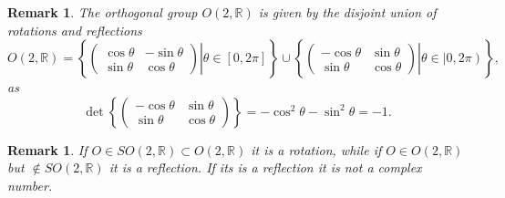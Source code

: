 \documentclass[aps,preprint]{revtex4}
\newtheorem{remark}[theorem]{Remark}
\begin{document}
\begin{remark}
The orthogonal group $O\left( 2,\mathbb{R}\right) $ is given by the disjoint
union of rotations and reflections 
\begin{equation}
O\left( 2,\mathbb{R}\right) =\left\{ \left. \left( 
\begin{array}{cc}
\cos \theta & -\sin \theta \\ 
\sin \theta & \cos \theta%
\end{array}%
\right) \right\vert \theta \in \left[ 0,2\pi \right] \right\} \cup \left\{
\left. \left( 
\begin{array}{cc}
-\cos \theta & \sin \theta \\ 
\sin \theta & \cos \theta%
\end{array}%
\right) \right\vert \theta \in \left\vert 0,2\pi \right) \right\} ,
\end{equation}%
as 
\begin{equation}
\det \left\{ \left( 
\begin{array}{cc}
-\cos \theta & \sin \theta \\ 
\sin \theta & \cos \theta%
\end{array}%
\right) \right\} =-\cos ^{2}\theta -\sin ^{2}\theta =-1.
\end{equation}
\end{remark}

\begin{remark}
If $O\in SO\left( 2,\mathbb{R}\right) \subset O\left( 2,\mathbb{R}\right) $
it is a rotation, while if $O\in O\left( 2,\mathbb{R}\right) $ but $\notin
SO\left( 2,\mathbb{R}\right) $ it is a reflection. If its is a reflection it
is not a complex number.
\end{remark}
\end{document}

